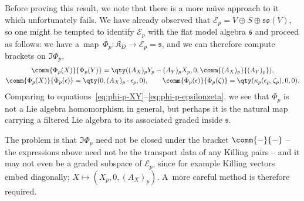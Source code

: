 \documentclass[10pt,a4paper]{amsart}
\numberwithin{equation}{section}
\newcommand{\fs}{\mathfrak{s}}
\newcommand{\fso}{\mathfrak{so}}
\newcommand{\fK}{\mathfrak{K}}
\newcommand{\eE}{\mathscr{E}}
\newcommand{\1}{\mathbbm{1}}
\begin{document}
\begin{Remark}
Before proving this result, we note that there is a more na\"{\i}ve approach to it which unfortunately fails. We have already observed that $\eE_p = V\oplus S\oplus\fso(V)$, so one might be tempted to identify $\eE_p$ with the flat model algebra $\fs$ and proceed as follows: we have a~map~${\Phi_p\colon \fK_D\to \eE_p=\fs}$, and we can therefore compute brackets on $\Im\Phi_p$,
\begin{gather*}
	\comm{\Phi_p(X)}{\Phi_p(Y)}
		= \qty((A_X)_p Y_p - (A_Y)_p X_p,0,\comm{(A_X)_p}{(A_Y)_p}),\\
	\comm{\Phi_p(X)}{\Phi_p(\epsilon)}
		= \qty(0,(A_X)_p\cdot\epsilon_p,0),\qquad
	\comm{\Phi_p(\epsilon)}{\Phi_p(\zeta)}
		= \qty(\kappa_p(\epsilon_p,\zeta_p),0,0).
\end{gather*}
Comparing to equations~\eqref{eq:phi-p-XY}--\eqref{eq:phi-p-epsilonzeta}, we see that $\Phi_p$ is not a Lie algebra homomorphism in general, but perhaps it is the natural map carrying a filtered Lie algebra to its associated graded inside $\fs$.

The problem is that $\Im\Phi_p$ need not be closed under the bracket $\comm{-}{-}$ -- the expressions above need not be the transport data of any Killing pairs -- and it may not even be a graded subspace of $\eE_p$, since for example Killing vectors embed diagonally; $X\mapsto(X_p,0,(A_X)_p)$. A~more careful method is therefore required.
\end{Remark}
\end{document}
